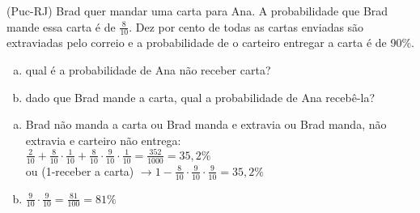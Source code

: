 \begin{ex}
 	(Puc-RJ) Brad quer mandar uma carta para Ana. A probabilidade que Brad mande essa carta é de $\frac{8}{10}$. Dez por cento de todas as cartas enviadas são extraviadas pelo correio e a probabilidade de o carteiro entregar a carta é de 90\%.
    \begin{enumerate}[(a)]
    \item qual é a probabilidade de Ana não receber carta?
    \item dado que Brad mande a carta, qual a probabilidade de Ana recebê-la?
    \end{enumerate}
      \begin{sol}
        \phantom{A} 
          \begin{enumerate}  [(a)]
              \item Brad não manda a carta ou Brad manda e extravia ou Brad manda, não extravia e carteiro não entrega: \\ $\frac{2}{10}+\frac{8}{10}\cdot\frac{1}{10}+\frac{8}{10}\cdot\frac{9}{10}\cdot\frac{1}{10}=\frac{352}{1000}=35,2\%$ \\
              ou (1-receber a carta)  $\longrightarrow1-\frac{8}{10}\cdot\frac{9}{10}\cdot\frac{9}{10}=35,2\%$
              \item $\frac{9}{10}\cdot\frac{9}{10}=\frac{81}{100}=81\%$
          \end{enumerate}
      \end{sol}
\end{ex}